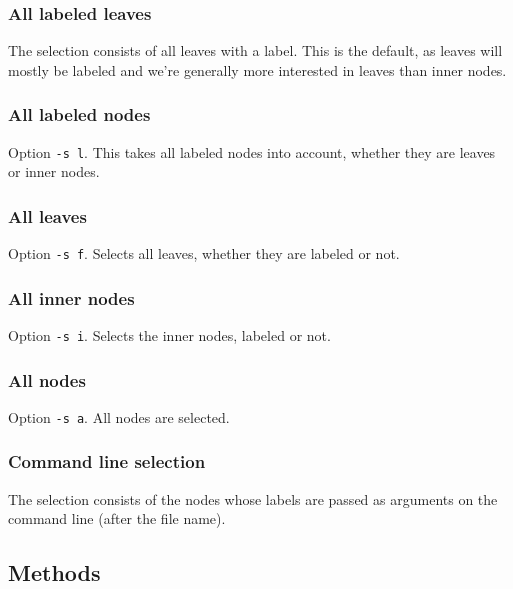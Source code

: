 \subsubsection{All labeled leaves}

The selection consists of all leaves with a label. This is the default, as
leaves will mostly be labeled and we're generally more interested in leaves
than inner nodes.



\subsubsection{All labeled nodes}

Option \texttt{-s l}. This takes all labeled nodes into account, whether they are leaves or inner nodes.



\subsubsection{All leaves}

Option \texttt{-s f}. Selects all leaves, whether they are
labeled or not.



\subsubsection{All inner nodes}

Option \texttt{-s i}. Selects the inner nodes, labeled or not.



\subsubsection{All nodes}

Option \texttt{-s a}. All nodes are selected.



\subsubsection{Command line selection}

The selection consists of the nodes whose labels are passed as arguments on
the command line (after the file name). 



\subsection{Methods}

